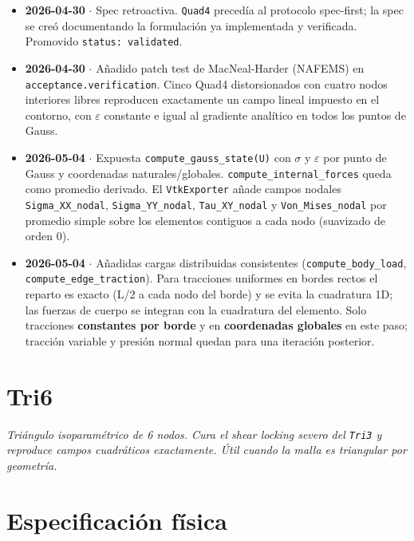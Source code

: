 \documentclass[11pt,letterpaper,oneside]{report}
\begin{document}
\begin{itemize}
  \item \textbf{2026-04-30} \ensuremath{\cdot} Spec retroactiva. \texttt{Quad4} precedía al protocolo spec-first; la spec se creó documentando la formulación ya implementada y verificada. Promovido \texttt{status: validated}.
  \item \textbf{2026-04-30} \ensuremath{\cdot} Añadido patch test de MacNeal-Harder (NAFEMS) en \texttt{acceptance.verification}. Cinco Quad4 distorsionados con cuatro nodos interiores libres reproducen exactamente un campo lineal impuesto en el contorno, con \ensuremath{\varepsilon} constante e igual al gradiente analítico en todos los puntos de Gauss.
  \item \textbf{2026-05-04} \ensuremath{\cdot} Expuesta \texttt{compute\_gauss\_state(U)} con \ensuremath{\sigma} y \ensuremath{\varepsilon} por punto de Gauss y coordenadas naturales/globales. \texttt{compute\_internal\_forces} queda como promedio derivado. El \texttt{VtkExporter} añade campos nodales \texttt{Sigma\_XX\_nodal}, \texttt{Sigma\_YY\_nodal}, \texttt{Tau\_XY\_nodal} y \texttt{Von\_Mises\_nodal} por promedio simple sobre los elementos contiguos a cada nodo (suavizado de orden 0).
  \item \textbf{2026-05-04} \ensuremath{\cdot} Añadidas cargas distribuidas consistentes (\texttt{compute\_body\_load}, \texttt{compute\_edge\_traction}). Para tracciones uniformes en bordes rectos el reparto es exacto (L/2 a cada nodo del borde) y se evita la cuadratura 1D; las fuerzas de cuerpo se integran con la cuadratura del elemento. Solo tracciones \textbf{constantes por borde} y en \textbf{coordenadas globales} en este paso; tracción variable y presión normal quedan para una iteración posterior.
\end{itemize}


\newpage

\section{Tri6}



\textit{Triángulo isoparamétrico de 6 nodos. Cura el shear locking severo del \texttt{Tri3} y reproduce campos cuadráticos exactamente. Útil cuando la malla es triangular por geometría.}



\section{Especificación física}
\end{document}
